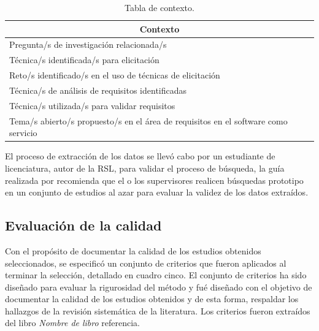 \documentclass[conference,onecolumn,10pt]{IEEEtran}
\begin{document}
\begin{table}[h!]
    \begin{center}
    \caption{Tabla de contexto.}
    \label{tab:datosgenerales}
    \begin{tabular}{|l|c|}
    \hline
    \multicolumn{2}{|c|}{Contexto} \\
    \hline
    Pregunta/s de investigación relacionada/s & \\
    \hline
    Técnica/s identificada/s para elicitación& \\
    \hline
    Reto/s identificado/s en el uso de técnicas de elicitación& \\
    \hline
    Técnica/s de análisis de requisitos identificadas& \\
    \hline
    Técnica/s utilizada/s para validar requisitos & \\
    \hline
    Tema/s abierto/s propuesto/s en el área de requisitos en el software como servicio& \\
    \hline
    \end{tabular}
    \end{center}
\end{table}


El proceso de extracción de los datos se llevó cabo por un estudiante de licenciatura, autor de la RSL, para validar el proceso de búsqueda, la guía realizada por
\cite{kitchenham2007guidelines} recomienda que el o los supervisores realicen búsquedas prototipo en un conjunto de estudios al azar para evaluar la validez 
de los datos extraídos.
\newpage

\subsection{Evaluación de la calidad}

Con el propósito de documentar la calidad de los estudios obtenidos seleccionados, 
se especificó un conjunto de criterios que fueron aplicados al terminar la 
selección, detallado en cuadro cinco.
El conjunto de criterios ha sido diseñado para evaluar la rigurosidad del método y fué 
diseñado con el objetivo de documentar la calidad de los estudios obtenidos y de esta forma, 
respaldar los hallazgos de la revisión sistemática de la literatura. Los criterios fueron 
extraídos del libro \emph{Nombre de libro} referencia.
\end{document}
